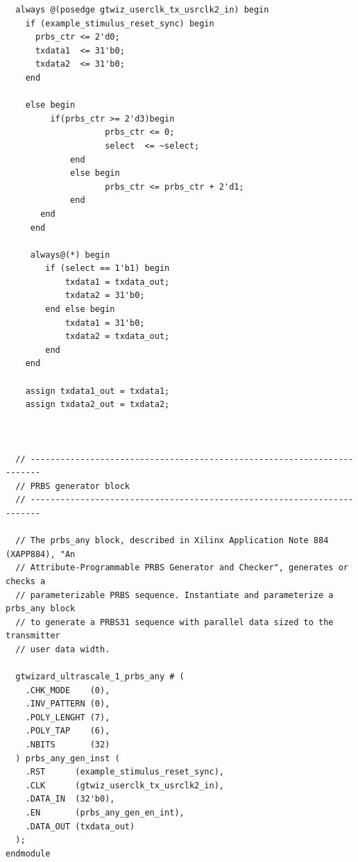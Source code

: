 \documentclass[oneside]{discothesis}
\begin{document}
\begin{verbatim}
  always @(posedge gtwiz_userclk_tx_usrclk2_in) begin
    if (example_stimulus_reset_sync) begin
      prbs_ctr <= 2'd0;
      txdata1  <= 31'b0;
      txdata2  <= 31'b0;
    end

    else begin
         if(prbs_ctr >= 2'd3)begin
                    prbs_ctr <= 0;
                    select  <= ~select;
             end
             else begin
                    prbs_ctr <= prbs_ctr + 2'd1;
             end
       end
     end
     
     always@(*) begin
        if (select == 1'b1) begin
            txdata1 = txdata_out;
            txdata2 = 31'b0;
        end else begin
            txdata1 = 31'b0;
            txdata2 = txdata_out;
        end
    end
    
    assign txdata1_out = txdata1;
    assign txdata2_out = txdata2;



  // ------------------------------------------------------------------------
  // PRBS generator block 
  // ------------------------------------------------------------------------

  // The prbs_any block, described in Xilinx Application Note 884 (XAPP884), "An
  // Attribute-Programmable PRBS Generator and Checker", generates or checks a
  // parameterizable PRBS sequence. Instantiate and parameterize a prbs_any block
  // to generate a PRBS31 sequence with parallel data sized to the transmitter
  // user data width.

  gtwizard_ultrascale_1_prbs_any # (
    .CHK_MODE    (0),
    .INV_PATTERN (0),
    .POLY_LENGHT (7),
    .POLY_TAP    (6),
    .NBITS       (32)
  ) prbs_any_gen_inst (
    .RST      (example_stimulus_reset_sync),
    .CLK      (gtwiz_userclk_tx_usrclk2_in),
    .DATA_IN  (32'b0),
    .EN       (prbs_any_gen_en_int),
    .DATA_OUT (txdata_out)
  );
endmodule
\end{verbatim}

\cleardoublepage
\end{document}

